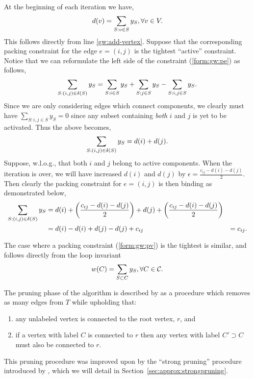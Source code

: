  At the beginning of each iteration we have,
 \[d(v) = \sum_{S: v \in S} y_S, \forall v \in V \mathnormal{.}\]
 This follows directly from line \ref{gw:add-vertex}. Suppose that the corresponding
 packing constraint for the edge $e = (i,j)$ is
  the tightest ``active'' constraint. Notice that we can reformulate the left side of the constraint (\ref{form:gw:pe}) as follows,
 \[\sum_{S: (i,j) \in \delta(S)} y_S = \sum_{S : i \in S} y_S + \sum_{S : j \in S} y_S - \sum_{S : i,j \in S} y_S\mathnormal{.}\]
 Since we are only considering edges which connect components, we clearly must have $\sum_{S : i,j \in S} y_S = 0$
 since any subset containing \textit{both} $i$ and $j$ is yet to be activated.
 Thus the above becomes,
 \[\sum_{S: (i,j) \in \delta(S)} y_S = d(i) + d(j)\mathnormal{.}\]
 Suppose, w.l.o.g., that both $i$ and $j$ belong to active components.
 When the iteration is over, we will have increased $d(i)$ and $d(j)$ by $\epsilon = \frac{c_{ij} - d(i) - d(j)}{2}$.
 Then clearly the packing constraint for $e = (i,j)$ is then binding as demonstrated below,
 \begin{align*}
\sum_{S: (i,j) \in \delta(S)} y_S &= d(i) + \left( \frac{c_{ij} - d(i) - d(j)}{2} \right) + d(j) +
                                    \left( \frac{c_{ij} - d(i) - d(j)}{2} \right) \\
                              &= d(i) - d(i) + d(j) - d(j) + c_{ij}
                                    &= c_{ij}\mathnormal{.}
 \end{align*}

 The case where a packing constraint (\ref{form:gw:pv}) is the tightest is similar, and follows directly from the loop
 invariant
 \[w(C) = \sum_{S \subset C} y_S, \forall C \in \mathcal{C}\mathnormal{.}\]

 The pruning phase of the algorithm is described by \citet{goemans1995general}
 as a procedure which removes as many
 edges from $T$ while upholding that:
 \begin{enumerate}
 \item any unlabeled vertex is connected to the root vertex, $r$, and
 \item if a vertex with label $C$ is connected to $r$ then any vertex with
   label $C' \supset C$ must also be connected to $r$.
 \end{enumerate}
 This pruning procedure was improved upon by the ``strong pruning'' procedure introduced by \citet{Johnson:2000:PCS:338219.338637},
  which we will detail in Section~\ref{sec:approx:strongpruning}.
